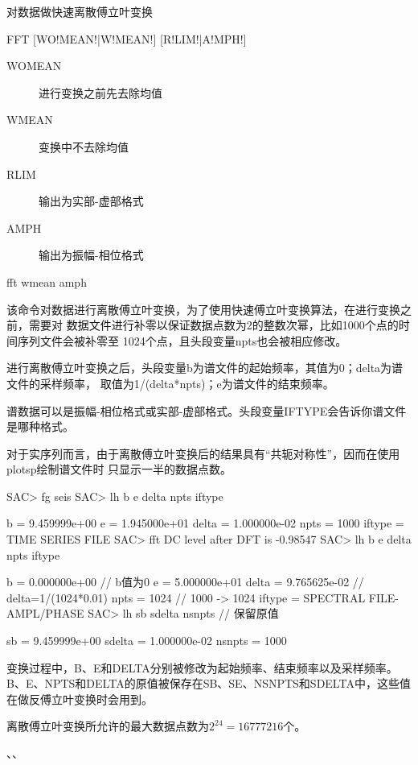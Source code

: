\label{cmd:fft}

对数据做快速离散傅立叶变换

\begin{SACSTX}
FFT [WO!MEAN!|W!MEAN!] [R!LIM!|A!MPH!]
\end{SACSTX}

\begin{description}
\item [WOMEAN] 进行变换之前先去除均值
\item [WMEAN] 变换中不去除均值
\item [RLIM] 输出为实部-虚部格式
\item [AMPH] 输出为振幅-相位格式
\end{description}

\begin{SACDFT}
fft wmean amph
\end{SACDFT}

该命令对数据进行离散傅立叶变换，为了使用快速傅立叶变换算法，在进行变换之前，需要对
数据文件进行补零以保证数据点数为2的整数次幂，比如1000个点的时间序列文件会被补零至
1024个点，且头段变量npts也会被相应修改。

进行离散傅立叶变换之后，头段变量b为谱文件的起始频率，其值为0；delta为谱文件的采样频率，
取值为1/(delta*npts)；e为谱文件的结束频率。

谱数据可以是振幅-相位格式或实部-虚部格式。头段变量IFTYPE会告诉你谱文件是哪种格式。

对于实序列而言，由于离散傅立叶变换后的结果具有“共轭对称性”，因而在使用plotsp绘制谱文件时
只显示一半的数据点数。

\begin{SACCode}
SAC> fg seis
SAC> lh b e delta npts iftype

          b = 9.459999e+00
          e = 1.945000e+01
      delta = 1.000000e-02
       npts = 1000
     iftype = TIME SERIES FILE
SAC> fft
 DC level after DFT is -0.98547
SAC> lh b e delta npts iftype

          b = 0.000000e+00              // b值为0
          e = 5.000000e+01
      delta = 9.765625e-02              // delta=1/(1024*0.01)
       npts = 1024                      // 1000 -> 1024
     iftype = SPECTRAL FILE-AMPL/PHASE
SAC> lh sb sdelta nsnpts                // 保留原值

         sb = 9.459999e+00
     sdelta = 1.000000e-02
     nsnpts = 1000
\end{SACCode}

变换过程中，B、E和DELTA分别被修改为起始频率、结束频率以及采样频率。
B、E、NPTS和DELTA的原值被保存在SB、SE、NSNPTS和SDELTA中，这些值在做反傅立叶变换时会用到。

离散傅立叶变换所允许的最大数据点数为$2^{24}=16777216$个。

、、
